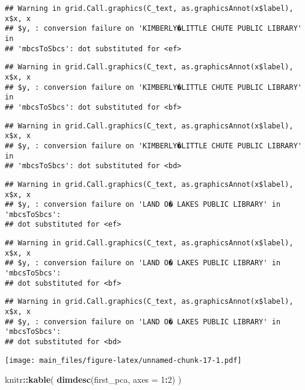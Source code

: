 \documentclass[14pt,]{article}
\newenvironment{Shaded}{\begin{snugshade}}{\end{snugshade}}
\newcommand{\DataTypeTok}[1]{\textcolor[rgb]{0.13,0.29,0.53}{#1}}
\newcommand{\DecValTok}[1]{\textcolor[rgb]{0.00,0.00,0.81}{#1}}
\newcommand{\KeywordTok}[1]{\textcolor[rgb]{0.13,0.29,0.53}{\textbf{#1}}}
\newcommand{\NormalTok}[1]{#1}
\newcommand{\OperatorTok}[1]{\textcolor[rgb]{0.81,0.36,0.00}{\textbf{#1}}}
\begin{document}
\begin{verbatim}
## Warning in grid.Call.graphics(C_text, as.graphicsAnnot(x$label), x$x, x
## $y, : conversion failure on 'KIMBERLY�LITTLE CHUTE PUBLIC LIBRARY' in
## 'mbcsToSbcs': dot substituted for <ef>
\end{verbatim}

\begin{verbatim}
## Warning in grid.Call.graphics(C_text, as.graphicsAnnot(x$label), x$x, x
## $y, : conversion failure on 'KIMBERLY�LITTLE CHUTE PUBLIC LIBRARY' in
## 'mbcsToSbcs': dot substituted for <bf>
\end{verbatim}

\begin{verbatim}
## Warning in grid.Call.graphics(C_text, as.graphicsAnnot(x$label), x$x, x
## $y, : conversion failure on 'KIMBERLY�LITTLE CHUTE PUBLIC LIBRARY' in
## 'mbcsToSbcs': dot substituted for <bd>
\end{verbatim}

\begin{verbatim}
## Warning in grid.Call.graphics(C_text, as.graphicsAnnot(x$label), x$x, x
## $y, : conversion failure on 'LAND O� LAKES PUBLIC LIBRARY' in 'mbcsToSbcs':
## dot substituted for <ef>
\end{verbatim}

\begin{verbatim}
## Warning in grid.Call.graphics(C_text, as.graphicsAnnot(x$label), x$x, x
## $y, : conversion failure on 'LAND O� LAKES PUBLIC LIBRARY' in 'mbcsToSbcs':
## dot substituted for <bf>
\end{verbatim}

\begin{verbatim}
## Warning in grid.Call.graphics(C_text, as.graphicsAnnot(x$label), x$x, x
## $y, : conversion failure on 'LAND O� LAKES PUBLIC LIBRARY' in 'mbcsToSbcs':
## dot substituted for <bd>
\end{verbatim}

\texttt{[image: main\_files/figure-latex/unnamed-chunk-17-1.pdf]}

\begin{Shaded}
\begin{Highlighting}[]
\NormalTok{knitr}\OperatorTok{::}\KeywordTok{kable}\NormalTok{(}
  \KeywordTok{dimdesc}\NormalTok{(first_pca, }\DataTypeTok{axes =} \DecValTok{1}\OperatorTok{:}\DecValTok{2}\NormalTok{)}
\NormalTok{)}
\end{Highlighting}
\end{Shaded}
\end{document}
